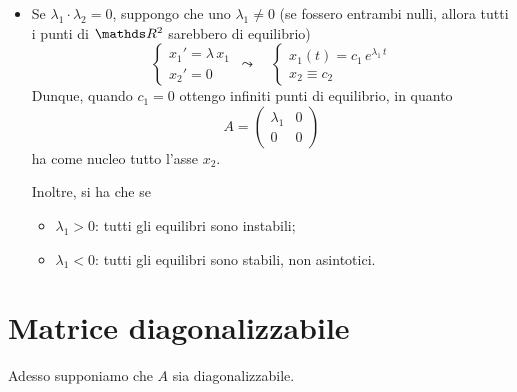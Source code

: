 {\begin{itemize}
\begin{itemize}
            In questo caso l'origine si chiama \emph{sella}, e si ha che \[
                x_2= c\,x_1^{\lambda_2/\lambda_1}.
            \]Essendo $ \lambda_2/\lambda_1<0 $, le orbite sono quelle di equazione $ y=c\,x^{\beta} $, eventualmente simmetrizzate rispetto all'asse delle $ y $.
        \end{itemize}
        \item Se $ \lambda_1 \cdot \lambda_2 = 0 $, suppongo che uno $\lambda_1 \neq 0$ (se fossero entrambi nulli, allora tutti i punti di $ \R^{2} $ sarebbero di equilibrio) \[
            \begin{cases}
                x_1'=\lambda\,x_1\\ 
                x_2'=0
            \end{cases}\,\leadsto\quad \begin{cases}
                x_1(t)=c_1\,e^{\lambda_1\,t}\\ 
                x_2\equiv c_2
            \end{cases}
        \]Dunque, quando $ c_1=0 $ ottengo infiniti punti di equilibrio, in quanto \[
            A=\begin{pmatrix}
                \lambda_1 & 0 \\ 
                 0 & 0
            \end{pmatrix}
        \]ha come nucleo tutto l'asse $ x_2 $. 

        Inoltre, si ha che se \begin{itemize}
            \item $\lambda_1>0$: tutti gli equilibri sono instabili;
            \item $\lambda_1<0$: tutti gli equilibri sono stabili, non asintotici.
        \end{itemize}
    \end{itemize}
}{}{}

\section{Matrice diagonalizzabile}
Adesso supponiamo che $A$ sia diagonalizzabile.

